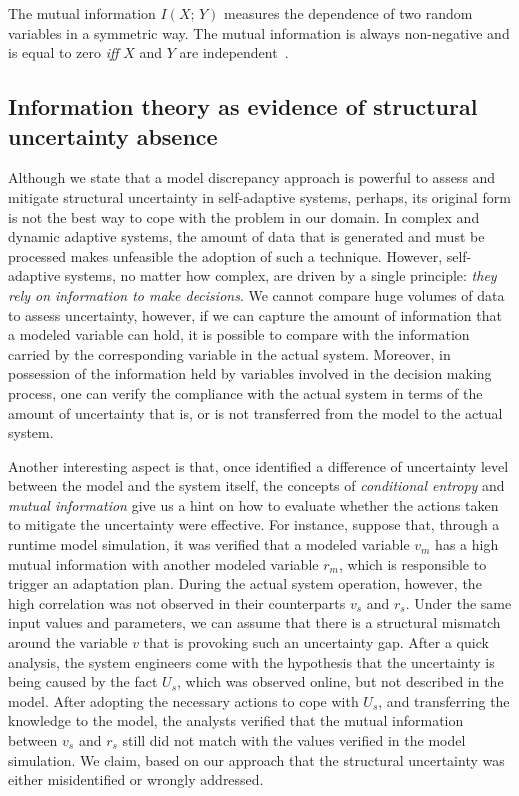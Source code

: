 \noindent
The mutual information $I(X;\,Y)$ measures the dependence of two random variables in a symmetric way. The mutual information is always non-negative and is equal to zero \textit{iff} $X$ and $Y$ are independent~\cite{cover2012elements}.

\subsection{Information theory as evidence of structural uncertainty absence}

Although we state that a model discrepancy approach is powerful to assess and mitigate structural uncertainty in self-adaptive systems, perhaps, its original form is not the best way to cope with the problem in our domain. In complex and dynamic adaptive systems, the amount of data that is generated and must be processed makes unfeasible the adoption of such a technique. However, self-adaptive systems, no matter how complex, are driven by a single principle: \textit{they rely on information to make decisions}. We cannot compare huge volumes of data to assess uncertainty, however, if we can capture the amount of information that a modeled variable can hold, it is possible to compare with the information carried by the corresponding variable in the actual system. Moreover, in possession of the information held by variables involved in the decision making process, one can verify the compliance with the actual system in terms of the amount of uncertainty that is, or is not transferred from the model to the actual system. 

Another interesting aspect is that, once identified a difference of uncertainty level between the model and the system itself, the concepts of \textit{conditional entropy} and \textit{mutual information} give us a hint on how to evaluate whether the actions taken to mitigate the uncertainty were effective. For instance, suppose that, through a runtime model simulation, it was verified that a modeled variable $v_m$ has a high mutual information with another modeled variable $r_m$, which is responsible to trigger an adaptation plan. During the actual system operation, however, the high correlation was not observed in their counterparts $v_s$ and $r_s$. Under the same input values and parameters, we can assume that there is a structural mismatch around the variable $v$ that is provoking such an uncertainty gap. After a quick analysis, the system engineers come with the hypothesis that the uncertainty is being caused by the fact $U_s$, which was observed online, but not described in the model. After adopting the necessary actions to cope with $U_s$, and transferring the knowledge to the model, the analysts verified that the mutual information between $v_s$ and $r_s$ still did not match with the values verified in the model simulation. We claim, based on our approach that the structural uncertainty was either misidentified or wrongly addressed.

